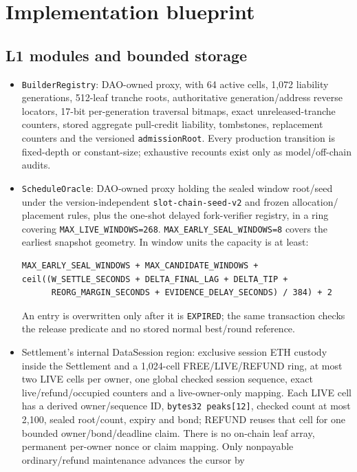 \documentclass[a4paper,11pt]{article}
\newcommand{\code}[1]{\nolinkurl{#1}}
\begin{document}
\section{Implementation blueprint}\label{sec:implementation}

\subsection{L1 modules and bounded storage}

\begin{itemize}
\item \code{BuilderRegistry}: DAO-owned proxy, with 64 active cells, 1,072 liability generations,
512-leaf tranche roots, authoritative generation/address reverse locators,
17-bit per-generation traversal bitmaps, exact unreleased-tranche counters,
stored aggregate pull-credit liability, tombstones, replacement counters and
the versioned \code{admissionRoot}.  Every production transition is fixed-depth
or constant-size; exhaustive recounts exist only as model/off-chain audits.
\item \code{ScheduleOracle}: DAO-owned proxy holding the sealed window root/seed
under the version-independent \code{slot-chain-seed-v2} and frozen allocation/
placement rules, plus the one-shot delayed fork-verifier registry, in a ring covering
\code{MAX_LIVE_WINDOWS=268}.  \code{MAX_EARLY_SEAL_WINDOWS=8} covers the
earliest snapshot geometry.  In window units the capacity is at least:
\begin{verbatim}
MAX_EARLY_SEAL_WINDOWS + MAX_CANDIDATE_WINDOWS +
ceil((W_SETTLE_SECONDS + DELTA_FINAL_LAG + DELTA_TIP +
      REORG_MARGIN_SECONDS + EVIDENCE_DELAY_SECONDS) / 384) + 2
\end{verbatim}
An entry is overwritten only after it is \code{EXPIRED}; the same transaction
checks the release predicate and no stored normal best/round reference.
\item Settlement's internal DataSession region: exclusive session ETH custody
inside the Settlement and a 1,024-cell FREE/LIVE/REFUND ring, at most
two LIVE cells per owner, one global checked
session sequence, exact live/refund/occupied counters and a live-owner-only
mapping.  Each LIVE cell has a derived owner/sequence ID,
\code{bytes32 peaks[12]}, checked count at most 2,100, sealed root/count, expiry
and bond; REFUND reuses that cell for one bounded owner/bond/deadline claim.
There is no on-chain leaf array, permanent per-owner nonce or claim mapping.
Only nonpayable ordinary/refund maintenance advances the cursor by

\end{itemize}
\end{document}
